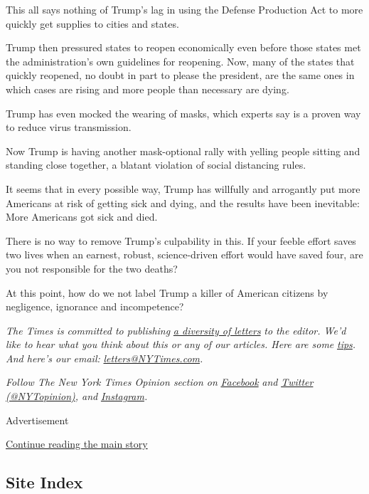This all says nothing of Trump's lag in using the Defense Production Act
to more quickly get supplies to cities and states.

Trump then pressured states to reopen economically even before those
states met the administration's own guidelines for reopening. Now, many
of the states that quickly reopened, no doubt in part to please the
president, are the same ones in which cases are rising and more people
than necessary are dying.

Trump has even mocked the wearing of masks, which experts say is a
proven way to reduce virus transmission.

Now Trump is having another mask-optional rally with yelling people
sitting and standing close together, a blatant violation of social
distancing rules.

It seems that in every possible way, Trump has willfully and arrogantly
put more Americans at risk of getting sick and dying, and the results
have been inevitable: More Americans got sick and died.

There is no way to remove Trump's culpability in this. If your feeble
effort saves two lives when an earnest, robust, science-driven effort
would have saved four, are you not responsible for the two deaths?

At this point, how do we not label Trump a killer of American citizens
by negligence, ignorance and incompetence?

\emph{The Times is committed to publishing}
\href{https://www.nytimes3xbfgragh.onion/2019/01/31/opinion/letters/letters-to-editor-new-york-times-women.html}{\emph{a
diversity of letters}} \emph{to the editor. We'd like to hear what you
think about this or any of our articles. Here are some}
\href{https://help.nytimes3xbfgragh.onion/hc/en-us/articles/115014925288-How-to-submit-a-letter-to-the-editor}{\emph{tips}}\emph{.
And here's our email:}
\href{mailto:letters@NYTimes.com}{\emph{letters@NYTimes.com}}\emph{.}

\emph{Follow The New York Times Opinion section on}
\href{https://www.facebookcorewwwi.onion/nytopinion}{\emph{Facebook}}
\emph{and} \href{http://twitter.com/NYTOpinion}{\emph{Twitter
(@NYTopinion)}}\emph{, and}
\href{https://www.instagram.com/nytopinion/}{\emph{Instagram}}\emph{.}

Advertisement

\protect\hyperlink{after-bottom}{Continue reading the main story}

\hypertarget{site-index}{%
\subsection{Site Index}\label{site-index}}


